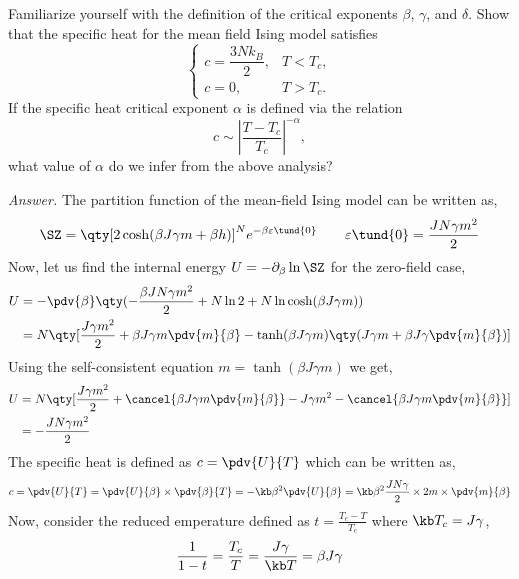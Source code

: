 \begin{question}
Familiarize yourself with the definition of the critical exponents $\beta$, $\gamma$, and $\delta$. Show that the specific heat for the mean field Ising model satisfies
\[
\begin{cases}
c = \dfrac{3N k_B}{2}, & T<T_c,\\[6pt]
c = 0, & T>T_c.
\end{cases}
\]
If the specific heat critical exponent $\alpha$ is defined via the relation
\[
c \sim \left|\frac{T-T_c}{T_c}\right|^{-\alpha},
\]
what value of $\alpha$ do we infer from the above analysis?
\end{question}
\noindent
\textit{Answer.} The partition function of the mean-field Ising model can be written as, 
$$\SZ =\qty[2\cosh(\beta J \gamma m +\beta h)]^N e^{-\beta \varepsilon\tund{0}}\qquad \varepsilon\tund{0} = \frac{J N \gamma m^2}{2}$$
Now, let us find the internal energy $U = -\partial_\beta \ln \SZ$ for the zero-field case,
\begin{align}
    \begin{split}
        U &= -\pdv{\beta}\qty(-\frac{\beta J N \gamma m^2}{2} +N\ln 2 + N \ln \cosh(\beta J \gamma m))\\
        &= N \qty[\frac{J\gamma m^2}{2} + {\beta J \gamma m} \pdv{m}{\beta} - \tanh(\beta J \gamma m)\qty(J\gamma m + \beta J \gamma \pdv{m}{\beta})]
    \end{split}
\end{align}
Using the self-consistent equation $m = \tanh(\beta J \gamma m)$ we get,
\begin{align}
    \begin{split}
        U &= N \qty[\frac{J\gamma m^2}{2} + \cancel{{\beta J \gamma m} \pdv{m}{\beta} }-J\gamma m^2 -\cancel{\beta J \gamma m\pdv{m}{\beta}}]\\
        &= -\frac{J N \gamma m^2}{2}
    \end{split}
\end{align}
The specific heat is defined as $c = \pdv{U}{T}$ which can be written as,
\begin{equation}\label{magn}
    c = \pdv{U}{T} = \pdv{U}{\beta}\times \pdv{\beta}{T} = -\kb \beta^2 \pdv{U}{\beta} = \kb \beta^2 \frac{JN\gamma}{2}\times 2m\times \pdv{m}{\beta}
\end{equation}
Now, consider the reduced emperature defined as $t=\frac{T_c-T}{T_c}$ where $\kb T_c  = J\gamma$, 
\begin{equation}
    \frac{1}{1-t} = \frac{T_c}{T} = \frac{J\gamma}{\kb T} = \beta J \gamma
\end{equation}
